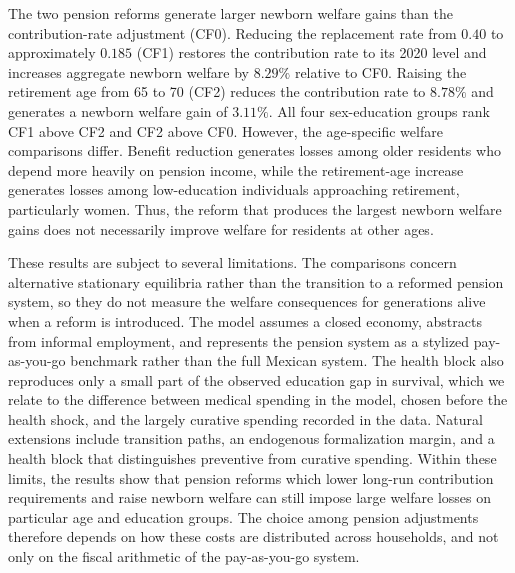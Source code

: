 \documentclass[12pt,a4paper]{article}
\begin{document}
The two pension reforms generate larger newborn welfare gains than the contribution-rate adjustment (CF0). Reducing the replacement rate from $0.40$ to approximately $0.185$ (CF1) restores the contribution rate to its 2020 level and increases aggregate newborn welfare by $8.29\%$ relative to CF0. Raising the retirement age from 65 to 70 (CF2) reduces the contribution rate to $8.78\%$ and generates a newborn welfare gain of $3.11\%$. All four sex-education groups rank CF1 above CF2 and CF2 above CF0. However, the age-specific welfare comparisons differ. Benefit reduction generates losses among older residents who depend more heavily on pension income, while the retirement-age increase generates losses among low-education individuals approaching retirement, particularly women. Thus, the reform that produces the largest newborn welfare gains does not necessarily improve welfare for residents at other ages.

These results are subject to several limitations. The comparisons concern alternative stationary equilibria rather than the transition to a reformed pension system, so they do not measure the welfare consequences for generations alive when a reform is introduced. The model assumes a closed economy, abstracts from informal employment, and represents the pension system as a stylized pay-as-you-go benchmark rather than the full Mexican system. The health block also reproduces only a small part of the observed education gap in survival, which we relate to the difference between medical spending in the model, chosen before the health shock, and the largely curative spending recorded in the data. Natural extensions include transition paths, an endogenous formalization margin, and a health block that distinguishes preventive from curative spending. Within these limits, the results show that pension reforms which lower long-run contribution requirements and raise newborn welfare can still impose large welfare losses on particular age and education groups. The choice among pension adjustments therefore depends on how these costs are distributed across households, and not only on the fiscal arithmetic of the pay-as-you-go system.




\end{document}
